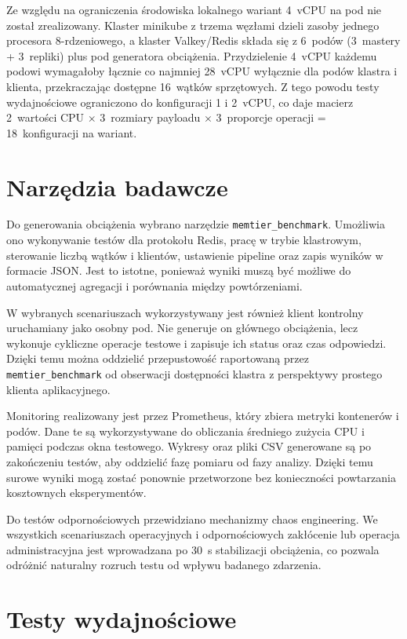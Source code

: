 Ze względu na ograniczenia środowiska lokalnego wariant 4~vCPU na pod nie został zrealizowany. Klaster minikube z trzema węzłami dzieli zasoby jednego procesora 8-rdzeniowego, a klaster Valkey/Redis składa się z 6~podów (3~mastery + 3~repliki) plus pod generatora obciążenia. Przydzielenie 4~vCPU każdemu podowi wymagałoby łącznie co najmniej 28~vCPU wyłącznie dla podów klastra i klienta, przekraczając dostępne 16~wątków sprzętowych. Z tego powodu testy wydajnościowe ograniczono do konfiguracji 1 i 2~vCPU, co daje macierz 2~wartości CPU $\times$ 3~rozmiary payloadu $\times$ 3~proporcje operacji = 18~konfiguracji na wariant.

\section{Narzędzia badawcze}

Do generowania obciążenia wybrano narzędzie \texttt{memtier\_benchmark}. Umożliwia ono wykonywanie testów dla protokołu Redis, pracę w trybie klastrowym, sterowanie liczbą wątków i klientów, ustawienie pipeline oraz zapis wyników w formacie JSON. Jest to istotne, ponieważ wyniki muszą być możliwe do automatycznej agregacji i porównania między powtórzeniami.

W wybranych scenariuszach wykorzystywany jest również klient kontrolny uruchamiany jako osobny pod. Nie generuje on głównego obciążenia, lecz wykonuje cykliczne operacje testowe i zapisuje ich status oraz czas odpowiedzi. Dzięki temu można oddzielić przepustowość raportowaną przez \texttt{memtier\_benchmark} od obserwacji dostępności klastra z perspektywy prostego klienta aplikacyjnego.

Monitoring realizowany jest przez Prometheus, który zbiera metryki kontenerów i podów. Dane te są wykorzystywane do obliczania średniego zużycia CPU i pamięci podczas okna testowego. Wykresy oraz pliki CSV generowane są po zakończeniu testów, aby oddzielić fazę pomiaru od fazy analizy. Dzięki temu surowe wyniki mogą zostać ponownie przetworzone bez konieczności powtarzania kosztownych eksperymentów.

Do testów odpornościowych przewidziano mechanizmy chaos engineering. We wszystkich scenariuszach operacyjnych i odpornościowych zakłócenie lub operacja administracyjna jest wprowadzana po 30~s stabilizacji obciążenia, co pozwala odróżnić naturalny rozruch testu od wpływu badanego zdarzenia.

\section{Testy wydajnościowe}

